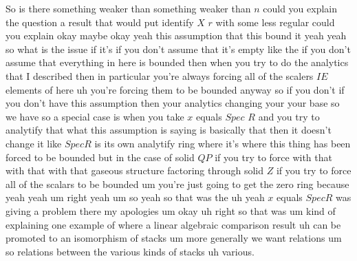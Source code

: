 So is there something weaker than something weaker than $n$ could you explain the question a result that would put identify $X$ $r$ with some less regular could you explain okay maybe okay yeah this assumption that this bound it yeah yeah so what is the issue if it's if you don't assume that it's empty like the if you don't assume that everything in here is bounded then when you try to do the analytics that I described then in particular you're always forcing all of the scalers $IE$ elements of here uh you're forcing them to be bounded anyway so if you don't if you don't have this assumption then your analytics changing your your base so we have so a special case is when you take $x$ equals $Spec$ $R$ and you try to analytify that what this assumption is saying is basically that then it doesn't change it like $SpecR$ is its own analytify ring where it's where this thing has been forced to be bounded but in the case of solid $QP$ if you try to force with that with that with that gaseous structure factoring through solid $Z$ if you try to force all of the scalars to be bounded um you're just going to get the zero ring because yeah yeah um right yeah um so yeah so that was the uh yeah $x$ equals $SpecR$ was giving a problem there my apologies um okay uh right so that was um kind of explaining one example of where a linear algebraic comparison result uh can be promoted to an isomorphism of stacks um more generally we want relations um so relations between the various kinds of stacks uh various.